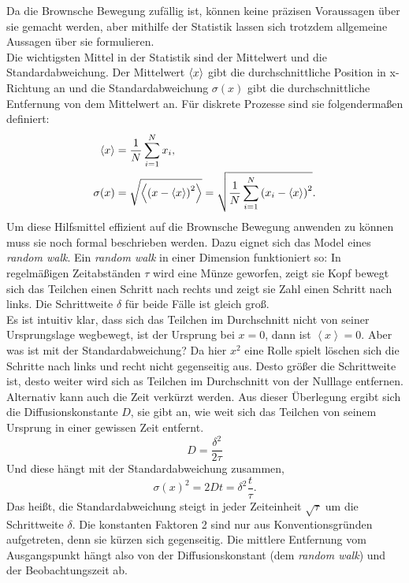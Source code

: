 Da die Brownsche Bewegung zufällig ist, können keine präzisen Voraussagen über sie gemacht werden, aber mithilfe der Statistik lassen sich trotzdem allgemeine Aussagen über sie formulieren.\\
Die wichtigsten Mittel in der Statistik sind der Mittelwert und die Standardabweichung. Der Mittelwert $\left< x \right>$ gibt die durchschnittliche Position in x-Richtung an und die Standardabweichung $\sigma(x)$ gibt die durchschnittliche Entfernung von dem Mittelwert an. Für diskrete Prozesse sind sie folgendermaßen definiert:
\begin{align}
  \left< x \right> & = \frac{1}{N} \sum_{i=1}^{N} x_i, \\
  \sigma(x) & = \sqrt{\left<  {\left( x - \left< x \right> \right)}^2  \right>} = \sqrt{\frac{1}{N} \sum_{i=1}^{N} {\left( x_i - \left< x \right> \right)}^2}.
\end{align}
Um diese Hilfsmittel effizient auf die Brownsche Bewegung anwenden zu können muss sie noch formal beschrieben werden. Dazu eignet sich das Model eines \textit{random walk}. Ein \textit{random walk} in einer Dimension funktioniert so: In regelmäßigen Zeitabständen $\tau$ wird eine Münze geworfen, zeigt sie Kopf bewegt sich das Teilchen einen Schritt nach rechts und zeigt sie Zahl einen Schritt nach links. Die Schrittweite $\delta$ für beide Fälle ist gleich groß.\\
Es ist intuitiv klar, dass sich das Teilchen im Durchschnitt nicht von seiner Ursprungslage wegbewegt, ist der Ursprung bei $x = 0$, dann ist $\left< x \right> = 0$. Aber was ist mit der Standardabweichung? Da hier $x^2$ eine Rolle spielt löschen sich die Schritte nach links und recht nicht gegenseitig aus.
Desto größer die Schrittweite ist, desto weiter wird sich as Teilchen im Durchschnitt von der Nulllage entfernen. Alternativ kann auch die Zeit verkürzt werden. Aus dieser Überlegung ergibt sich die Diffusionskonstante $D$, sie gibt an, wie weit sich das Teilchen von seinem Ursprung in einer gewissen Zeit entfernt.
\begin{equation}
  D = \frac{\delta^2}{2 \tau}
\end{equation}
Und diese hängt mit der Standardabweichung zusammen,
\begin{equation}
  \sigma(x)^2 = 2Dt = \delta^2 \frac{t}{\tau}.
\end{equation}
Das heißt, die Standardabweichung steigt in jeder Zeiteinheit $\sqrt{\tau}$ um die Schrittweite $\delta$. Die konstanten Faktoren 2 sind nur aus Konventionsgründen aufgetreten, denn sie kürzen sich gegenseitig. Die mittlere Entfernung vom Ausgangspunkt hängt also von der Diffusionskonstant (dem \textit{random walk}) und der Beobachtungszeit ab.\\
